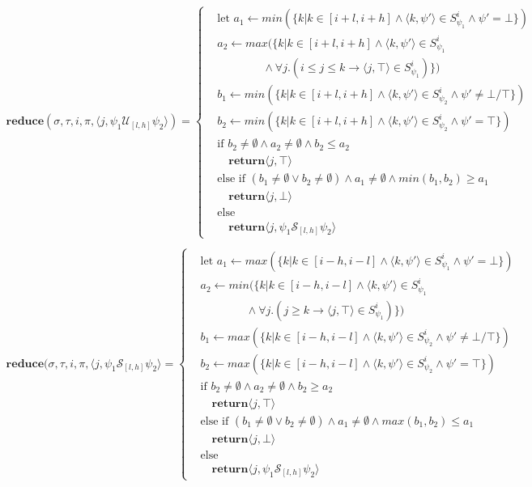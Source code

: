 \documentclass[10pt,a4paper]{article}
\newcommand{\rp}[2]{\ensuremath{\langle #1, #2 \rangle}}
\begin{document}
\begin{align*}
\mathbf{reduce}(\sigma,\tau, i,\pi,\rp{j}{\psi_1 \mathcal{U}_{[l,h]} \psi_2}) = \left\{
\begin{aligned}
&\text{let } a_1 \leftarrow min(\{k | k \in [i+l, i+h] \wedge \rp{k}{\psi'} \in S^i_{\psi_1} \wedge \psi' = \bot \}) \\
&a_2 \leftarrow max(\{k | k \in [i+l, i+h] \wedge  \rp{k}{\psi'} \in S^i_{\psi_1} \\  
	& \quad \quad \quad \quad \wedge \forall j. (i \leq j \leq k \rightarrow \rp{j}{\top} \in S^i_{\psi_1}) \}) \\
&b_1 \leftarrow min(\{k | k \in [i+l, i+h] \wedge \rp{k}{\psi'} \in S^i_{\psi_2} \wedge \psi' \neq \bot/\top \}) \\
&b_2 \leftarrow min(\{k | k \in [i+l, i+h] \wedge \rp{k}{\psi'} \in S^i_{\psi_2} \wedge \psi' = \top \}) \\
&\text{if }b_2 \neq \emptyset \wedge a_2 \neq \emptyset \wedge b_2 \leq a_2 \\
& \quad\mathbf{return} \rp{j}{\top} \\
&\text{else if } (b_1 \neq \emptyset \vee b_2 \neq \emptyset) \wedge a_1 \neq \emptyset \wedge min(b_1,b_2) \geq a_1 \\
& \quad\mathbf{return} \rp{j}{\bot} \\
&\text{else} \\
& \quad\mathbf{return} \rp{j}{\psi_1 \mathcal{S}_{[l,h]} \psi_2}
\end{aligned} \right. \\
\end{align*}
\begin{align*}
\mathbf{reduce}(\sigma,\tau, i,\pi,\rp{j}{\psi_1 \mathcal{S}_{[l,h]} \psi_2} = \left\{
\begin{aligned}
&\text{let } a_1 \leftarrow max(\{k | k \in [i-h, i-l] \wedge \rp{k}{\psi'} \in S^i_{\psi_1} \wedge \psi' = \bot \}) \\
&a_2 \leftarrow min(\{k | k \in [i-h, i-l] \wedge \rp{k}{\psi'} \in S^i_{\psi_1} \\
&\quad \quad \quad \quad \wedge \forall j. (j \geq k \rightarrow \rp{j}{\top} \in S^i_{\psi_1}) \}) \\
&b_1 \leftarrow max(\{k | k \in [i-h, i-l] \wedge \rp{k}{\psi'} \in S^i_{\psi_2} \wedge \psi' \neq \bot/\top \}) \\
&b_2 \leftarrow max(\{k | k \in [i-h, i-l] \wedge \rp{k}{\psi'} \in S^i_{\psi_2} \wedge \psi' = \top \}) \\
&\text{if } b_2 \neq \emptyset \wedge a_2 \neq \emptyset \wedge b_2 \geq a_2 \\
& \quad\mathbf{return} \rp{j}{\top} \\
&\text{else if } (b_1 \neq \emptyset \vee b_2 \neq \emptyset) \wedge a_1 \neq \emptyset \wedge max(b_1,b_2) \leq a_1 \\
& \quad\mathbf{return} \rp{j}{\bot} \\
&\text{else} \\
& \quad\mathbf{return} \rp{j}{\psi_1 \mathcal{S}_{[l,h]} \psi_2}
\end{aligned} \right. \\
\end{align*}
\end{document}
